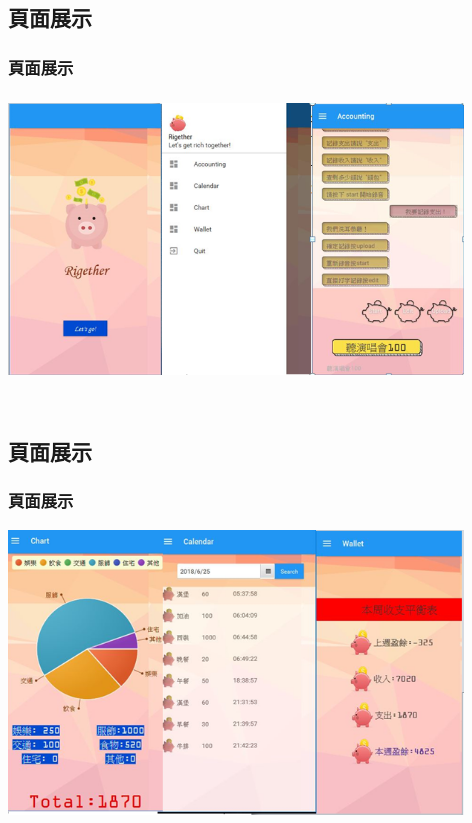 \documentclass{beamer}
\begin{document}

\subsection{頁面展示} %
\begin{frame}
\frametitle{頁面展示}
\includegraphics[width=4.75in,height=3in]{1.png}\\~\\


\end{frame}


\subsection{頁面展示} %
\begin{frame}
\frametitle{頁面展示}
\includegraphics[width=4.75in,height=3in]{2.png}\\~\\


\end{frame}
\end{document}
